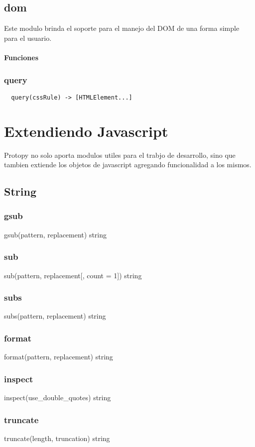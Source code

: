 {{\subsection{dom}
Este modulo brinda el soporte para el manejo del DOM de una forma simple para el usuario.
\paragraph{Funciones}
\subsubsection*{query}
\begin{verbatim}
  query(cssRule) -> [HTMLElement...]
\end{verbatim}

\section{Extendiendo Javascript}
Protopy no solo aporta modulos utiles para el trabjo de desarrollo, sino que
tambien extiende los objetos de javascript agregando funcionalidad a los mismos.
\subsection{String}
\subsubsection*{gsub}
gsub(pattern, replacement) \rightarrow string
\subsubsection*{sub}
sub(pattern, replacement[, count = 1]) \rightarrow string
\subsubsection*{subs}
subs(pattern, replacement) \rightarrow string
\subsubsection*{format}
format(pattern, replacement) \rightarrow string
\subsubsection*{inspect} 
inspect(use_double_quotes) \rightarrow string
\subsubsection*{truncate}
truncate(length, truncation) \rightarrow string
}}
